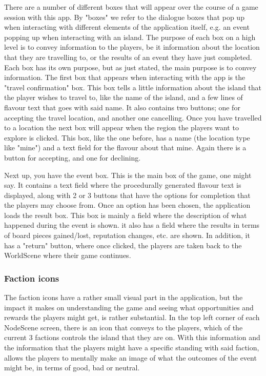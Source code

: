 There are a number of different boxes that will appear over the course of a game session with this app. By "boxes" we refer to the dialogue boxes that pop up when interacting with different elements of the application itself, e.g. an event popping up when interacting with an island.
The purpose of each box on a high level is to convey information to the players, be it information about the location that they are travelling to, or the results of an event they have just completed.
Each box has its own purpose, but as just stated, the main purpose is to convey information. The first box that appears when interacting with the app is the "travel confirmation" box. This box tells a little information about the island that the player wishes to travel to, like the name of the island, and a few lines of flavour text that goes with said name. It also contains two buttons; one for accepting the travel location, and another one cancelling.
Once you have travelled to a location the next box will appear when the region the players want to explore is clicked. This box, like the one before, has a name (the location type like "mine") and a text field for the flavour about that mine. Again there is a button for accepting, and one for declining. 

Next up, you have the event box. This is the main box of the game, one might say. It contains a text field where the procedurally generated flavour text is displayed, along with 2 or 3 buttons that have the options for completion that the players may choose from. 
Once an option has been chosen, the application loads the result box. This box is mainly a field where the description of what happened during the event is shown. it also has a field where the results in terms of board pieces gained/lost, reputation changes, etc. are shown. In addition, it has a "return" button, where once clicked, the players are taken back to the WorldScene where their game continues.


\subsubsection{Faction icons}
The faction icons have a rather small visual part in the application, but the impact it makes on understanding the game and seeing what opportunities and rewards the players might get, is rather substantial. In the top left corner of each NodeScene screen, there is an icon that conveys to the players, which of the current 3 factions controls the island that they are on. With this information and the information that the players might have a specific standing with said faction, allows the players to mentally make an image of what the outcomes of the event might be, in terms of good, bad or neutral.

